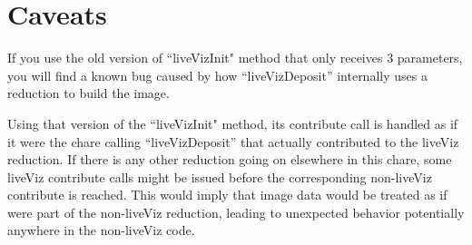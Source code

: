 \section{Caveats}
If you use the old version of ``liveVizInit" method that only receives 3 parameters, you will find a known bug caused by how ``liveVizDeposit'' internally uses a reduction to build the image.

Using that version of the ``liveVizInit" method, its contribute call is handled as if it were the chare calling ``liveVizDeposit'' that actually contributed to the liveViz reduction.
If there is any other reduction going on elsewhere in this chare, some liveViz contribute calls might be issued before the corresponding non-liveViz contribute is reached.
This would imply that image data would be treated as if were part of the non-liveViz reduction, leading to unexpected behavior potentially anywhere in the non-liveViz code.
